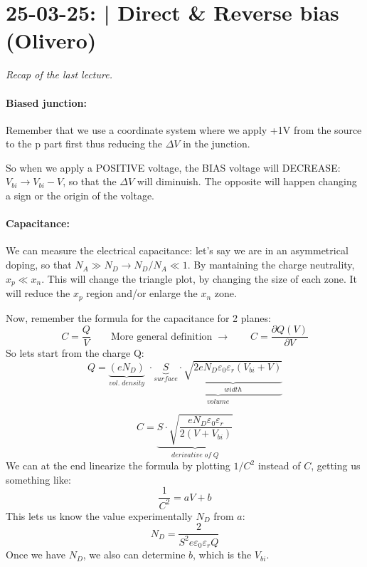 \section{25-03-25: | Direct \& Reverse bias (Olivero)}

\textit{Recap of the last lecture.}

\paragraph{Biased junction:} Remember that we use a coordinate system where we apply +1V from the source to the p part first thus reducing the $\Delta V$ in the junction.

So when we apply a POSITIVE voltage, the BIAS voltage will DECREASE: $V_{bi} \rightarrow V_{bi} - V$, so that the $\Delta V$ will diminuish. The opposite will happen changing a sign or the origin of the voltage.

\paragraph{Capacitance:} We can measure the electrical capacitance: let's say we are in an asymmetrical doping, so that $N_A \gg N_D \rightarrow N_D / N_A \ll 1$. By mantaining the charge neutrality, $x_p \ll x_n$. This will change the triangle plot, by changing the size of each zone. It will reduce the $x_p$ region and/or enlarge the $x_n$ zone.

Now, remember the formula for the capacitance for 2 planes:
\begin{equation}
    C = \frac{Q}{V} \qquad \text{More general definition} \; \rightarrow \qquad C = \frac{\partial Q(V)}{\partial V}  
\end{equation}
So lets start from the charge Q:
\begin{equation}
    Q = \underbrace{(eN_D)}_{vol. \; density} \;\cdot \underbrace{\underbrace{S}_{surface} \cdot \underbrace{\sqrt{2eN_D \varepsilon_0\varepsilon_r ( V_{bi} + V)}}_{width}}_{volume}
\end{equation}

\begin{equation}
    C = \underbrace{S \cdot \sqrt{\frac{eN_D\varepsilon_0\varepsilon_r}{2(V + V_{bi})}}}_{derivative\;of\;Q}
\end{equation}
We can at the end linearize the formula by plotting $1/C^2$ instead of $C$, getting us something like:
\begin{equation}
    \frac{1}{C^2} = aV + b
\end{equation}
This lets us know the value experimentally $N_D$ from $a$:
\begin{equation}
    N_D = \frac{2}{S^2e\varepsilon_0\varepsilon_rQ}
\end{equation}
Once we have $N_D$, we also can determine $b$, which is the $V_{bi}$.

